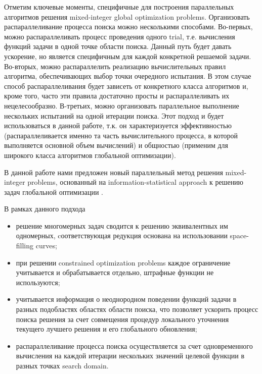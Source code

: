 \documentclass[
11pt,%
tightenlines,%
twoside,%
onecolumn,%
nofloats,%
nobibnotes,%
nofootinbib,%
superscriptaddress,%
noshowpacs,%
centertags]%
{revtex4}
\begin{document}
Отметим ключевые моменты, специфичные для построения параллельных алгоритмов решения mixed-integer global optimization problems. Организовать распараллеливание процесса поиска можно несколькими способами.
Во-первых, можно распараллеливать процесс проведения одного trial, т.е. вычисления функций задачи в одной точке области поиска. Данный путь будет давать ускорение, но является специфичным для каждой конкретной решаемой задачи.
Во-вторых, можно распараллелить реализацию вычислительных правил алгоритма, обеспечивающих выбор точки очередного испытания. В этом случае способ распараллеливания будет зависеть от конкретного класса алгоритмов и, кроме того, часто эти правила достаточно просты и распараллеливать их нецелесообразно.
В-третьих, можно организовать параллельное выполнение нескольких испытаний на одной итерации поиска. Этот подход и будет использоваться в данной работе, т.к. он характеризуется эффективностью (распараллеливается именно та часть вычислительного процесса, в которой выполняется основной объем вычислений) и общностью (применим для широкого класса алгоритмов глобальной оптимизации).

В данной работе нами предложен новый параллельный метод решения mixed-integer problems, основанный на information-statistical approach к решению задач глобальной оптимизации \cite{Strongin2000,Strongin2013}. 

В рамках данного подхода 
\begin{itemize}
	\item 
	решение многомерных задач сводится  к решению эквивалентных им одномерных, cоответствующая редукция основана на использовании space-filling curves;
	\item 
	при решении constrained optimization problems каждое ограничение учитывается и обрабатывается отдельно, штрафные функции не используются;
	\item
	учитывается информация о неоднородном поведении функций задачи в разных подобластях областях области поиска, что позволяет ускорить процесс поиска решения за счет совмещения процедур локального уточнения текущего лучшего решения и его глобального обновления;
	\item 
	распараллеливание процесса поиска осуществляется за счет одновременного вычисления на каждой итерации нескольких значений целевой функции в разных точках search domain.	
\end{itemize}
\end{document}
